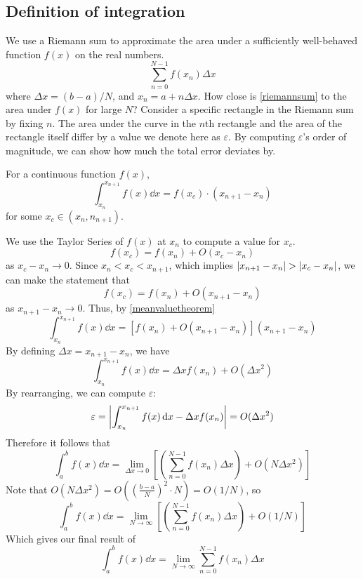 \subsection{Definition of integration}
We use a Riemann sum to approximate the area under a sufficiently well-behaved function \(f(x)\) on the real numbers.
\begin{equation}\label{riemannsum}
	\sum_{n=0}^{N-1} f(x_n) \Delta x
\end{equation}
where \(\Delta x = (b-a)/N\), and \(x_n = a + n\Delta x\).
How close is \eqref{riemannsum} to the area under \(f(x)\) for large \(N\)?
Consider a specific rectangle in the Riemann sum by fixing \(n\).
The area under the curve in the \(n\)th rectangle and the area of the rectangle itself differ by a value we denote here as \(\varepsilon\).
By computing \(\varepsilon\)'s order of magnitude, we can show how much the total error deviates by.

\begin{theorem}
	For a continuous function \(f(x)\),
	\begin{equation}\label{meanvaluetheorem}
		\int_{x_n}^{x_{n+1}} f(x) \dd{x} = f(x_c) \cdot (x_{n+1} - x_n)
	\end{equation}
	for some \(x_c\in (x_n, n_{n+1})\).
\end{theorem}
\noindent We use the Taylor Series of \(f(x)\) at \(x_n\) to compute a value for \(x_c\).
\[
	f(x_c) = f(x_n) + O(x_c - x_n)
\]
as \(x_c - x_n \to 0\).
Since \(x_n < x_c < x_{n+1}\), which implies \(\abs{x_{n+1} - x_n} > \abs{x_c - x_n}\), we can make the statement that
\[
	f(x_c) = f(x_n) + O(x_{n+1} - x_n)
\]
as \(x_{n+1} - x_n \to 0\).
Thus, by \eqref{meanvaluetheorem}
\[
	\int_{x_n}^{x_{n+1}} f(x) \dd{x} = \left[ f(x_n) + O(x_{n+1} - x_n) \right] (x_{n+1} - x_n)
\]
By defining \(\Delta x = x_{n+1} - x_n\), we have
\begin{equation}
	\int_{x_n}^{x_{n+1}} f(x) \dd{x} = \Delta x f(x_n) + O(\Delta x ^ 2)
\end{equation}
By rearranging, we can compute \(\varepsilon\):
\[
	\varepsilon = \abs{\int_{x_n}^{x_{n+1}} f(x) \dd{x} - \Delta x f(x_n)} = O(\Delta x ^ 2)
\]
Therefore it follows that
\[
	\int_{a}^{b} f(x) \dd{x} = \lim_{\Delta x \to 0} \left[ \left( \sum_{n=0}^{N-1} f(x_n) \Delta x \right) + O(N\Delta x^2) \right]
\]
Note that \(O(N\Delta x^2) = O((\frac{b-a}{N})^2 \cdot N) = O(1/N)\), so
\[
	\int_{a}^{b} f(x) \dd{x} = \lim_{N \to \infty} \left[ \left( \sum_{n=0}^{N-1} f(x_n) \Delta x \right) + O(1/N) \right]
\]
Which gives our final result of
\begin{equation}\label{definiteintegral}
	\int_{a}^{b} f(x) \dd{x} = \lim_{N \to \infty} \sum_{n=0}^{N-1} f(x_n) \Delta x
\end{equation}

